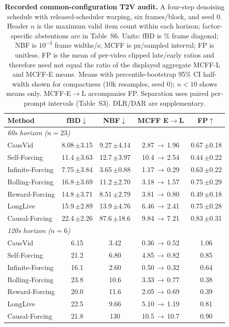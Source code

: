 \begin{table}[!tb]
\centering
\scriptsize
\setlength{\tabcolsep}{2.6pt}
\begin{tabular}{lcccc}
\toprule
Method & fBD$\downarrow$ & NBF$\downarrow$ & MCFF E$\rightarrow$L & FP$\uparrow$ \\
\midrule
\multicolumn{5}{l}{\textit{60s horizon  ($n=23$)}} \\
CausVid & 8.08\,\tiny$\pm$3.15 & 9.27\,\tiny$\pm$4.14 & 2.87\,$\rightarrow$\,1.96 & 0.67\,\tiny$\pm$0.18 \\
Self-Forcing & 11.4\,\tiny$\pm$3.63 & 12.7\,\tiny$\pm$3.97 & 10.4\,$\rightarrow$\,2.54 & 0.44\,\tiny$\pm$0.22 \\
Infinite-Forcing & 7.75\,\tiny$\pm$3.84 & 3.65\,\tiny$\pm$0.88 & 1.17\,$\rightarrow$\,0.29 & 0.63\,\tiny$\pm$0.22 \\
Rolling-Forcing & 16.8\,\tiny$\pm$3.69 & 11.2\,\tiny$\pm$2.70 & 3.18\,$\rightarrow$\,1.57 & 0.75\,\tiny$\pm$0.29 \\
Reward-Forcing & 14.8\,\tiny$\pm$3.71 & 8.51\,\tiny$\pm$2.79 & 3.81\,$\rightarrow$\,0.80 & 0.49\,\tiny$\pm$0.18 \\
LongLive & 15.9\,\tiny$\pm$2.89 & 13.9\,\tiny$\pm$4.76 & 6.46\,$\rightarrow$\,2.41 & 0.75\,\tiny$\pm$0.28 \\
Causal-Forcing & 22.4\,\tiny$\pm$2.26 & 87.6\,\tiny$\pm$18.6 & 9.84\,$\rightarrow$\,7.21 & 0.83\,\tiny$\pm$0.31 \\
\midrule
\multicolumn{5}{l}{\textit{120s horizon  ($n=6$)}} \\
CausVid & 6.15 & 3.42 & 0.36\,$\rightarrow$\,0.52 & 1.06 \\
Self-Forcing & 21.2 & 6.80 & 4.85\,$\rightarrow$\,0.82 & 0.85 \\
Infinite-Forcing & 16.1 & 2.60 & 0.50\,$\rightarrow$\,0.32 & 0.64 \\
Rolling-Forcing & 23.8 & 10.6 & 3.33\,$\rightarrow$\,0.77 & 0.38 \\
Reward-Forcing & 20.0 & 11.6 & 2.05\,$\rightarrow$\,0.69 & 0.39 \\
LongLive & 22.5 & 9.66 & 5.10\,$\rightarrow$\,1.19 & 0.81 \\
Causal-Forcing & 21.8 & 130 & 10.5\,$\rightarrow$\,10.7 & 0.90 \\
\bottomrule
\end{tabular}
\caption{\textbf{Recorded common-configuration T2V audit.} A four-step denoising schedule with released-scheduler warping, six frames/block, and seed $0$. Header $n$ is the maximum valid item count within each horizon; factor-specific abstentions are in Table~S6. Units: fBD is \% frame diagonal; NBF is $10^{-3}$ frame widths/s; MCFF is px/sampled interval; FP is unitless. FP is the mean of per-video clipped late/early ratios and therefore need not equal the ratio of the displayed aggregate MCFF-L and MCFF-E means. Means with percentile-bootstrap 95\% CI half-width shown for compactness (10k resamples, seed 0); $n<10$ shows means only. MCFF-E$\rightarrow$L accompanies FP. Separation uses paired per-prompt intervals (Table~S3). DLR/DAR are supplementary.}
\label{tab:t2v_audit}
\end{table}